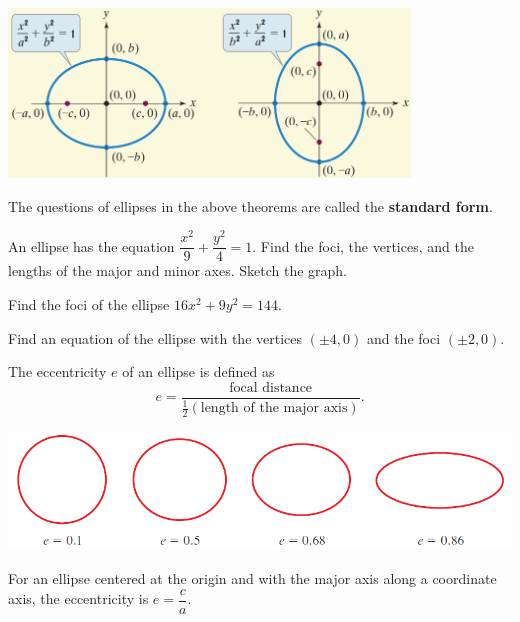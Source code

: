 \begin{center}
 \includegraphics[width=0.8\textwidth,keepaspectratio]{figs/EllipseGraphs.png}
\end{center}

The questions of ellipses in the above theorems are called the \textbf{standard form}.

\begin{example}
An ellipse has the equation $\dfrac{x^2}{9}+\dfrac{y^2}{4}=1$.
Find the foci, the vertices, and the lengths of the major and minor axes. Sketch the graph.
\end{example}
\vspace*{6\baselineskip}

\begin{example}
    Find the foci of the ellipse $16x^2+9y^2=144$.
\end{example}
\vspace*{6\baselineskip}

\begin{example}
Find an equation of the ellipse with the vertices $(\pm 4, 0)$ and the foci $(\pm 2, 0)$.
\end{example}
\vspace*{6\baselineskip}

\begin{definition}
The eccentricity $e$ of an ellipse is defined as
\[e=\dfrac{\text{focal distance}}{\frac12\left(\text{length of the major axis}\right)}.\]
\begin{center}
    \includegraphics[scale=0.8]{figs/EllipseWithVariousEccentricities.png}
\end{center}
\end{definition}

For an ellipse centered at the origin and with the major axis along a coordinate axis, the eccentricity is $e=\dfrac ca$.

